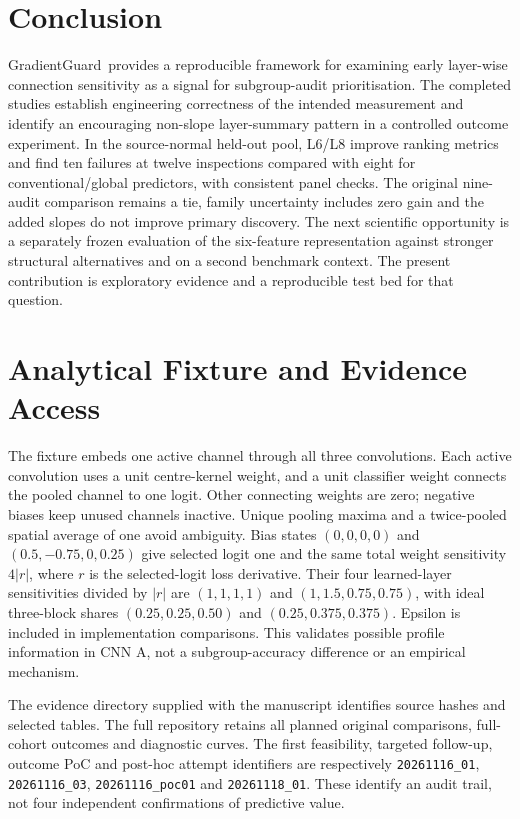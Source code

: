 \section{Conclusion}
GradientGuard\ provides a reproducible framework for examining early layer-wise connection sensitivity as a signal for subgroup-audit prioritisation. The completed studies establish engineering correctness of the intended measurement and identify an encouraging non-slope layer-summary pattern in a controlled outcome experiment. In the source-normal held-out pool, L6/L8 improve ranking metrics and find ten failures at twelve inspections compared with eight for conventional/global predictors, with consistent panel checks. The original nine-audit comparison remains a tie, family uncertainty includes zero gain and the added slopes do not improve primary discovery. The next scientific opportunity is a separately frozen evaluation of the six-feature representation against stronger structural alternatives and on a second benchmark context. The present contribution is exploratory evidence and a reproducible test bed for that question.


\section{Analytical Fixture and Evidence Access}
\label{app:fixture}
The fixture embeds one active channel through all three convolutions. Each active convolution uses a unit centre-kernel weight, and a unit classifier weight connects the pooled channel to one logit. Other connecting weights are zero; negative biases keep unused channels inactive. Unique pooling maxima and a twice-pooled spatial average of one avoid ambiguity. Bias states $(0,0,0,0)$ and $(0.5,-0.75,0,0.25)$ give selected logit one and the same total weight sensitivity $4|r|$, where $r$ is the selected-logit loss derivative. Their four learned-layer sensitivities divided by $|r|$ are $(1,1,1,1)$ and $(1,1.5,0.75,0.75)$, with ideal three-block shares $(0.25,0.25,0.50)$ and $(0.25,0.375,0.375)$. Epsilon is included in implementation comparisons. This validates possible profile information in CNN A, not a subgroup-accuracy difference or an empirical mechanism.

The evidence directory supplied with the manuscript identifies source hashes and selected tables. The full repository retains all planned original comparisons, full-cohort outcomes and diagnostic curves. The first feasibility, targeted follow-up, outcome PoC and post-hoc attempt identifiers are respectively \texttt{20261116\_01}, \texttt{20261116\_03}, \texttt{20261116\_poc01} and \texttt{20261118\_01}. These identify an audit trail, not four independent confirmations of predictive value.

